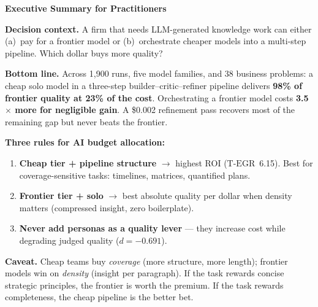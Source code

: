 \documentclass[12pt,a4paper]{article}
\newcommand{\TEGR}{\ensuremath{\text{T-EGR}}}
\begin{document}
\begin{mdframed}[style=execsummary]
\textbf{Executive Summary for Practitioners}

\medskip
\noindent\textbf{Decision context.} A firm that needs LLM-generated knowledge
work can either (a)~pay for a frontier model or (b)~orchestrate cheaper models
into a multi-step pipeline. Which dollar buys more quality?

\medskip
\noindent\textbf{Bottom line.} Across 1{,}900 runs, five model families, and 38
business problems: a cheap solo model in a three-step builder--critic--refiner
pipeline delivers \textbf{98\% of frontier quality at 23\% of the cost}.
Orchestrating a frontier model costs \textbf{3.5$\times$ more for negligible
gain}. A \$0.002 refinement pass recovers most of the remaining gap but never
beats the frontier.

\medskip
\noindent\textbf{Three rules for AI budget allocation:}
\begin{enumerate}[leftmargin=*,nosep]
  \item \textbf{Cheap tier + pipeline structure} $\to$ highest ROI
    ($\TEGR$~6.15). Best for coverage-sensitive tasks: timelines, matrices,
    quantified plans.
  \item \textbf{Frontier tier + solo} $\to$ best absolute quality per dollar
    when density matters (compressed insight, zero boilerplate).
  \item \textbf{Never add personas as a quality lever} --- they increase cost
    while degrading judged quality ($d = -0.691$).
\end{enumerate}

\medskip
\noindent\textbf{Caveat.} Cheap teams buy \emph{coverage} (more structure, more
length); frontier models win on \emph{density} (insight per paragraph). If the
task rewards concise strategic principles, the frontier is worth the premium.
If the task rewards completeness, the cheap pipeline is the better bet.
\end{mdframed}

\end{document}
